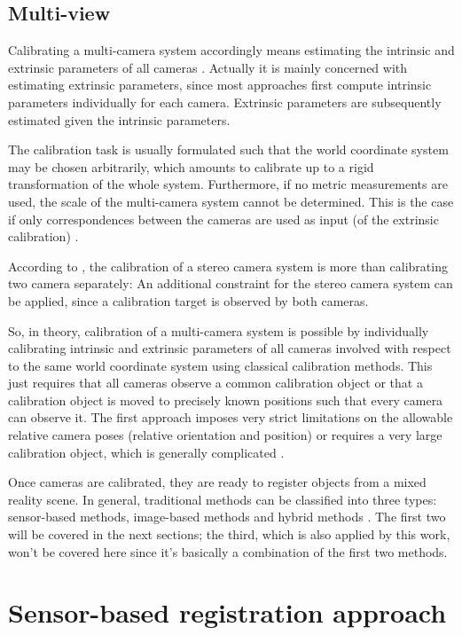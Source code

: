 \documentclass[msc, a4paper, classic, en]{ufbathesis}
\begin{document}
\subsection{Multi-view}

Calibrating a multi-camera system accordingly means estimating the intrinsic and extrinsic parameters of all cameras \cite{bajramovic2010self}. Actually it is mainly concerned with estimating extrinsic parameters, since most approaches first compute intrinsic parameters individually for each camera. Extrinsic parameters are subsequently estimated given the intrinsic parameters.

The calibration task is usually formulated such that the world coordinate system may be chosen arbitrarily, which amounts to calibrate up to a rigid transformation of the whole system. Furthermore, if no metric measurements are used, the scale of the multi-camera system cannot be determined. This is the case if only correspondences between the cameras are used as input (of the extrinsic calibration) \cite{bajramovic2010self}.

According to \cite{hanning2011high}, the calibration of a stereo camera system is more than calibrating two camera separately: An additional constraint for the stereo camera system can be applied, since a calibration target is observed by both cameras.

So, in theory, calibration of a multi-camera system is possible by individually calibrating intrinsic and extrinsic parameters of all cameras involved with respect to the same world coordinate system using classical calibration methods. This just requires that all cameras observe a common calibration object or that a calibration object is moved to precisely known positions such that every camera can observe it. The first approach imposes very strict limitations on the allowable relative camera poses (relative orientation and position) or requires a very large calibration object, which is generally complicated \cite{Chen00widearea}.

Once cameras are calibrated, they are ready to register objects from a mixed reality scene. In general, traditional methods can be classified into three types: sensor-based methods, image-based methods and hybrid methods \cite{shumaker2011virtual}. The first two will be covered in the next sections; the third, which is also applied by this work, won't be covered here since it's basically a combination of the first two methods.

\section{Sensor-based registration approach}
\end{document}
